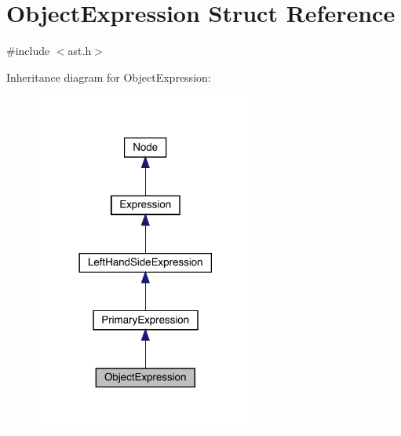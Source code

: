 \hypertarget{struct_object_expression}{}\section{Object\+Expression Struct Reference}
\label{struct_object_expression}


{\ttfamily \#include $<$ast.\+h$>$}



Inheritance diagram for Object\+Expression\+:\nopagebreak
\begin{figure}[H]
\begin{center}
\leavevmode
\includegraphics[width=206pt]{struct_object_expression__inherit__graph}
\end{center}
\end{figure}



